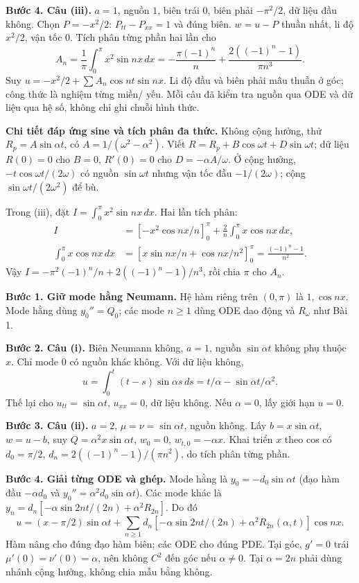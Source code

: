 \textbf{Bước 4. Câu (iii).} $a=1$, nguồn $1$, biên trái $0$, biên phải $-\pi^2/2$, dữ liệu đầu không. Chọn $P=-x^2/2$: $P_{tt}-P_{xx}=1$ và đúng biên. $w=u-P$ thuần nhất, li độ $x^2/2$, vận tốc $0$. Tích phân từng phần hai lần cho
\[A_n=\frac1\pi\int_0^\pi x^2\sin nx\,dx
=-\frac{\pi(-1)^n}{n}+\frac{2((-1)^n-1)}{\pi n^3}.\]
Suy $u=-x^2/2+\sum A_n\cos nt\sin nx$. Li độ đầu và biên phải mâu thuẫn ở góc; công thức là nghiệm từng miền/ yếu. Mỗi câu đã kiểm tra nguồn qua ODE và dữ liệu qua hệ số, không chỉ ghi chuỗi hình thức.

\textbf{Chi tiết đáp ứng sine và tích phân đa thức.} Không cộng hưởng, thử $R_p=A\sin\alpha t$, có $A=1/(\omega^2-\alpha^2)$. Viết $R=R_p+B\cos\omega t+D\sin\omega t$; dữ liệu $R(0)=0$ cho $B=0$, $R'(0)=0$ cho $D=-\alpha A/\omega$. Ở cộng hưởng, $-t\cos\omega t/(2\omega)$ có nguồn $\sin\omega t$ nhưng vận tốc đầu $-1/(2\omega)$; cộng $\sin\omega t/(2\omega^2)$ để bù.

Trong (iii), đặt $I=\int_0^\pi x^2\sin nx\,dx$. Hai lần tích phân:
\[\begin{aligned}
I&=\left[-x^2\cos nx/n\right]_0^\pi+\frac2n\int_0^\pi x\cos nx\,dx,\\
\int_0^\pi x\cos nx\,dx
&=\left[x\sin nx/n+\cos nx/n^2\right]_0^\pi
=\frac{(-1)^n-1}{n^2}.
\end{aligned}\]
Vậy $I=-\pi^2(-1)^n/n+2((-1)^n-1)/n^3$, rồi chia $\pi$ cho $A_n$.

\textbf{Bước 1. Giữ mode hằng Neumann.} Hệ hàm riêng trên $(0,\pi)$ là $1,\cos nx$. Mode hằng dùng $y_0''=Q_0$; các mode $n\ge1$ dùng ODE dao động và $R_\omega$ như Bài 1.

\textbf{Bước 2. Câu (i).} Biên Neumann không, $a=1$, nguồn $\sin\alpha t$ không phụ thuộc $x$. Chỉ mode $0$ có nguồn khác không. Với dữ liệu không,
\[u=\int_0^t(t-s)\sin\alpha s\,ds=t/\alpha-\sin\alpha t/\alpha^2.\]
Thế lại cho $u_{tt}=\sin\alpha t$, $u_{xx}=0$, dữ liệu không. Nếu $\alpha=0$, lấy giới hạn $u=0$.

\textbf{Bước 3. Câu (ii).} $a=2$, $\mu=\nu=\sin\alpha t$, nguồn không. Lấy $b=x\sin\alpha t$, $w=u-b$, suy $Q=\alpha^2x\sin\alpha t$, $w_0=0$, $w_{t,0}=-\alpha x$. Khai triển $x$ theo cos có $d_0=\pi/2$, $d_n=2((-1)^n-1)/(\pi n^2)$, do tích phân từng phần.

\textbf{Bước 4. Giải từng ODE và ghép.} Mode hằng là $y_0=-d_0\sin\alpha t$ (đạo hàm đầu $-\alpha d_0$ và $y_0''=\alpha^2d_0\sin\alpha t$). Các mode khác là $y_n=d_n[-\alpha\sin2nt/(2n)+\alpha^2R_{2n}]$. Do đó
\[u=(x-\pi/2)\sin\alpha t+\sum_{n\ge1}d_n[-\alpha\sin2nt/(2n)+\alpha^2R_{2n}(\alpha,t)]\cos nx.\]
Hàm nâng cho đúng đạo hàm biên; các ODE cho đúng PDE. Tại góc, $g'=0$ trái $\mu'(0)=\nu'(0)=\alpha$, nên không $C^2$ đến góc nếu $\alpha\ne0$. Tại $\alpha=2n$ phải dùng nhánh cộng hưởng, không chia mẫu bằng không.


